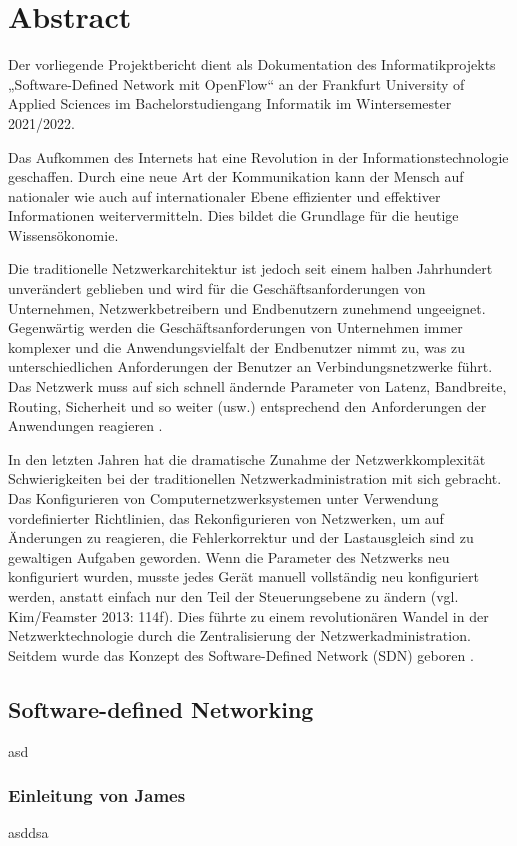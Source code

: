 \documentclass[fontsize=12pt,paper=a4,open=any,parskip=half,
  twoside=false,toc=listof,toc=bibliography,fleqn,leqno,
  captions=nooneline,captions=tableabove,british]{scrbook}
\begin{document}
\chapter{Abstract}\label{ch:intro}
Der vorliegende Projektbericht dient als Dokumentation des Informatikprojekts „Software-Defined Network mit OpenFlow“ an der Frankfurt University of Applied Sciences im Bachelorstudiengang Informatik im Wintersemester 2021/2022.\par
Das Aufkommen des Internets hat eine Revolution in der Informationstechnologie geschaffen. Durch eine neue Art der Kommunikation kann der Mensch auf nationaler wie auch auf internationaler Ebene effizienter und effektiver Informationen weitervermitteln. Dies bildet die Grundlage für die heutige Wissensökonomie. \par
Die traditionelle Netzwerkarchitektur ist jedoch seit einem halben Jahrhundert unverändert geblieben und wird für die Geschäftsanforderungen von Unternehmen, Netzwerkbetreibern und Endbenutzern zunehmend ungeeignet. Gegenwärtig werden die Geschäftsanforderungen von Unternehmen immer komplexer und die Anwendungsvielfalt der Endbenutzer nimmt zu, was zu unterschiedlichen Anforderungen der Benutzer an Verbindungsnetzwerke führt. Das Netzwerk muss auf sich schnell ändernde Parameter von Latenz, Bandbreite, Routing, Sicherheit und so weiter (usw.) entsprechend den Anforderungen der Anwendungen reagieren \cite{case}.\par
In den letzten Jahren hat die dramatische Zunahme der Netzwerkkomplexität Schwierigkeiten bei der traditionellen Netzwerkadministration mit sich gebracht. Das Konfigurieren von Computernetzwerksystemen unter Verwendung vordefinierter Richtlinien, das Rekonfigurieren von Netzwerken, um auf Änderungen zu reagieren, die Fehlerkorrektur und der Lastausgleich sind zu gewaltigen Aufgaben geworden. Wenn die Parameter des Netzwerks neu konfiguriert wurden, musste jedes Gerät manuell vollständig neu konfiguriert werden, anstatt einfach nur den Teil der Steuerungsebene zu ändern (vgl. Kim/Feamster 2013: 114f). Dies führte zu einem revolutionären Wandel in der Netzwerktechnologie durch die Zentralisierung der Netzwerkadministration. Seitdem wurde das Konzept des Software-Defined Network (SDN) geboren \cite[114-115]{improve}. 


\section{Software-defined Networking}\label{sdn}
asd
\subsection{Einleitung von James}\label{einl-james}
asddsa
\end{document}
